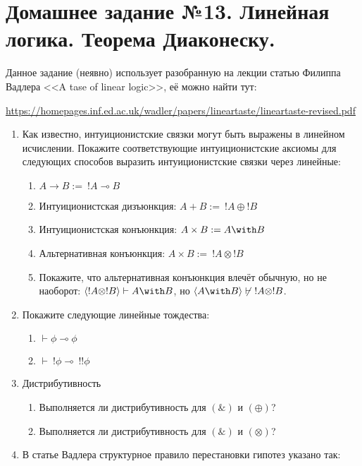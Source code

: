 \documentclass[10pt,a4paper,oneside]{article}
\begin{document}
\section*{Домашнее задание №13. Линейная логика. Теорема Диаконеску.}

Данное задание (неявно) использует разобранную на лекции статью Филиппа Вадлера <<A tase of linear logic>>, её можно найти тут:

\url{https://homepages.inf.ed.ac.uk/wadler/papers/lineartaste/lineartaste-revised.pdf}

\begin{enumerate}
\item Как известно, интуиционистские связки могут быть выражены в линейном исчислении.
Покажите соответствующие интуиционистские аксиомы для следующих способов выразить интуиционистские связки
через линейные:
\begin{enumerate}
\item $A \rightarrow B :=\ !A \multimap B$
\item Интуиционистская дизъюнкция: $A + B :=\ !A \oplus !B$
\item Интуиционистская конъюнкция: $A \times B := A \with B$
\item Альтернативная конъюнкция: $A \times B :=\ !A \otimes !B$ 
\item Покажите, что альтернативная конъюнкция влечёт обычную, но не наоборот: $\langle!A \otimes !B\rangle \vdash A \with B$,
но $\langle A \with B\rangle \not\vdash \ !A \otimes !B$.
\end{enumerate}

\item Покажите следующие линейные тождества:
\begin{enumerate}
\item $\vdash \phi \multimap \phi$
\item $\vdash \ !\phi \multimap \ !!\phi$
\end{enumerate}

\item Дистрибутивность
\begin{enumerate}
\item Выполняется ли дистрибутивность для $(\&)$ и $(\oplus)$?
\item Выполняется ли дистрибутивность для $(\&)$ и $(\otimes)$?
\end{enumerate}

\item В статье Вадлера структурное правило перестановки гипотез указано так:


\end{enumerate}
\end{document}

